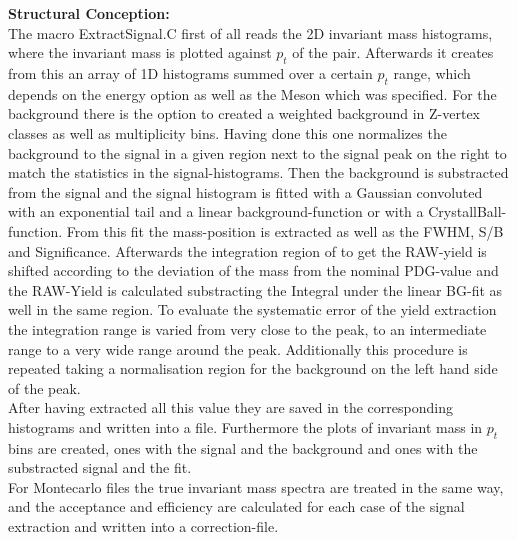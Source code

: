 		\noindent \textbf{Structural Conception:}\\
		The macro ExtractSignal.C first of all reads the 2D invariant mass histograms, where the invariant mass is plotted against $p_t$ of the pair. Afterwards it creates from this an array of 1D histograms summed over a certain $p_t$ range, which depends on the energy option as well as the Meson which was specified. For the background there is the option to created a weighted background in Z-vertex classes as well as multiplicity bins. Having done this one normalizes the background to the signal in a given region next to the signal peak on the right to match the statistics in the signal-histograms. Then the background is substracted from the signal and the signal histogram is fitted with a Gaussian convoluted with an exponential tail and a linear background-function or with a CrystallBall-function. From this fit the mass-position is extracted as well as the FWHM, S/B and Significance. Afterwards the integration region of to get the RAW-yield is shifted according to the deviation of the mass from the nominal PDG-value and the RAW-Yield is calculated substracting the Integral under the linear BG-fit as well in the same region. To evaluate the systematic error of the yield extraction the integration range is varied from very close to the peak, to an intermediate range to a very wide range around the peak. Additionally this procedure is repeated taking a normalisation region for the background on the left hand side of the peak. \\
		After having extracted all this value they are saved in the corresponding histograms and written into a file. Furthermore the plots of invariant mass in $p_t$ bins are created, ones with the signal and the background and ones with the substracted signal and the fit.  \\
		For Montecarlo files the true invariant mass spectra are treated in the same way, and the acceptance and efficiency are calculated for each case of the signal extraction and written into a correction-file.\\
		
